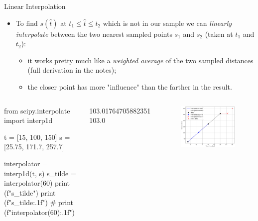 \documentclass{beamer}
\begin{document}
\begin{frame}[fragile]{Linear Interpolation}
  \begin{itemize}
  \item To find $s(\hat{t})$ at $t_1 \leq \hat{t} \leq t_2$ which is not in our sample we can \emph{linearly interpolate} between the two nearest sampled points $s_1$ and $s_2$ (taken at $t_1$ and $t_2$):
    \begin{itemize}
    \item it works pretty much like a \emph{weighted average} of the two sampled distances (full derivation in the notes);
    \item the closer point has more "influence" than the farther in the result.
    \end{itemize}
  \end{itemize}
  \begin{columns}
  \begin{ipython}
from scipy.interpolate import interp1d

t = [15, 100, 150]
s = [25.75, 171.7, 257.7]

interpolator = interp1d(t, s)
s_tilde = interpolator(60)
print (f"{s_tilde}")
print (f"{s_tilde:.1f}")
# print (f"{interpolator(60):.1f}")
\end{ipython}
\begin{ioutput}
103.01764705882351
103.0
\end{ioutput}
    \begin{figure}[h]	
        \begin{center}
        \includegraphics[width=0.85\linewidth]{interp2}
        \end{center}
    \end{figure}
  \end{columns}
\end{frame}
\end{document}

